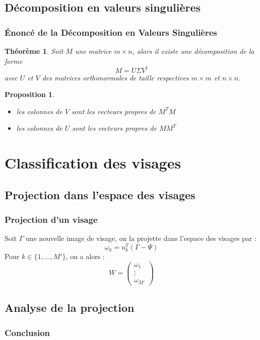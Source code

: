 \documentclass{beamer}
\theoremstyle{plain}
\newtheorem{thm}{Théorème}
\newtheorem{prop}{Proposition}
\theoremstyle{definition}
\begin{document}
\subsection{Décomposition en valeurs singulières}
\begin{frame}
  \frametitle{\'{E}noncé de la Décomposition en Valeurs Singulières}
  \begin{thm}
    Soit $M$ une matrice $m \times n$, alors il existe une décomposition de la forme
    \[
      M = U \Sigma V^t
    \]
    avec $U$ et $V$ des matrices orthonormales de taille respectives $m \times m$ et $n \times n$.
  \end{thm}
  
  \begin{prop}
    \begin{itemize}
    \item les colonnes de $V$ sont les vecteurs propres de $M^TM$
    \item les colonnes de $U$ sont les vecteurs propres de $MM^T$
    \end{itemize}
  \end{prop}
\end{frame}


\section{Classification des visages}
\subsection{Projection dans l'espace des visages}
\begin{frame}
  \frametitle{Projection d'un visage}
  Soit $\Gamma$ une nouvelle image de visage, on la projette dans l'espace des visages par :
  \[
    \omega_k = u_k^T(\Gamma - \Psi)
  \]
  \pause
  Pour $k \in \{1,\dotsc,M'\}$, on a alors :
  \[W =
    \begin{pmatrix}
      \omega_1 \\
      \vdots \\
      \omega_{M'}
    \end{pmatrix}
  \]
\end{frame}
\subsection{Analyse de la projection}


\begin{frame}
  \frametitle{Conclusion}
\end{frame}
\end{document}
